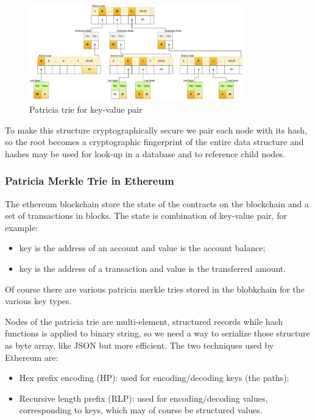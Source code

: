 \begin{figure}[H]
    \centering
    \includegraphics[width=350px]{images/4_Cryptographic_Toolbox/03.png}
    \caption{Patricia trie for key-value pair}
\end{figure}

To make this structure cryptographically secure we pair each node with its hash, so the root becomes a cryptographic fingerprint of the entire data structure and hashes may be used for look-up in a database and to reference child nodes.

\subsubsection{Patricia Merkle Trie in Ethereum}
The ethereum blockchain store the state of the contracts on the blockchain and a set of transactions in blocks.
The state is combination of key-value pair, for example:
\begin{itemize}
    \item key is the address of an account and value is the account balance;
    \item key is the address of a transaction and value is the transferred amount.
\end{itemize}
Of course there are various patricia merkle tries stored in the blobkchain for the various key types.

Nodes of the patricia trie are multi-element, structured records while hash functions is applied to binary string, so we need a way to serialize those structure as byte array, like JSON but more efficient.
The two techniques used by Ethereum are:
\begin{itemize}
    \item Hex prefix encoding (HP): used for encoding/decoding keys (the paths);
    \item Recursive length prefix (RLP): used for encoding/decoding values, corresponding to keys, which may of course be structured values.
\end{itemize}

